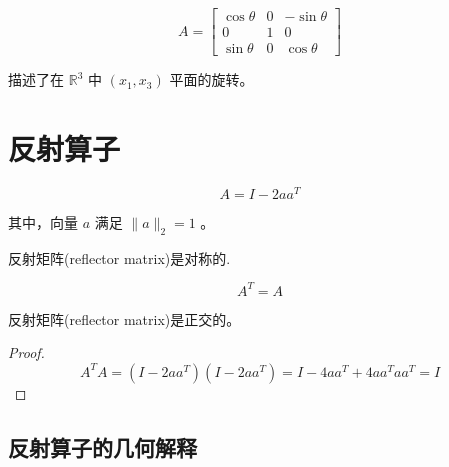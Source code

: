 \begin{example}
    $$ A=\left[\begin{array}{ccc}\cos \theta & 0 & -\sin \theta \\ 0 & 1 & 0 \\ \sin \theta & 0 & \cos \theta\end{array}\right] $$

    描述了在 $ \mathbb{R}^{3} $ 中 $ \left(x_{1}, x_{3}\right) $ 平面的旋转。
\end{example}

\section{反射算子}

\begin{definition}[Reflector]
    $$
A=I-2 a a^{T}
$$

其中，向量 $ a $ 满足 $ \|a\|_{2}=1 $ 。
\end{definition}

\begin{theorem}
    反射矩阵(reflector matrix)是对称的.

    $$A^T=A$$
\end{theorem}

\begin{theorem}
    反射矩阵(reflector matrix)是正交的。

\end{theorem}

\begin{proof}
    $$ A^{T} A=\left(I-2 a a^{T}\right)\left(I-2 a a^{T}\right)=I-4 a a^{T}+4 a a^{T} a a^{T}=I $$
\end{proof}

\subsection{反射算子的几何解释}

